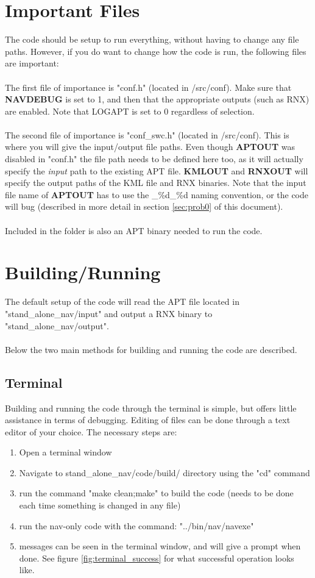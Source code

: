 \documentclass[10pt,a4paper]{article}
\begin{document}
\section{Important Files}
\label{sec:files}
The code should be setup to run everything, without having to change any file paths. However, if you do want to change how the code is run, the following files are important: \\ \\
\noindent
The first file of importance is "conf.h" (located in /src/conf). Make sure that \textbf{NAVDEBUG} is set to 1, and then that the appropriate outputs (such as RNX) are enabled. Note that LOGAPT is set to 0 regardless of selection. \\ \\
\noindent
The second file of importance is "conf\_swc.h" (located in /src/conf). This is where you will give the input/output file paths. Even though \textbf{APTOUT} was disabled in "conf.h" the file path needs to be defined here too, as it will actually specify the \textit{input} path to the existing APT file. \textbf{KMLOUT} and \textbf{RNXOUT} will specify the output paths of the KML file and RNX binaries. Note that the input file name of \textbf{APTOUT} has to use the \_\%d\_\%d naming convention, or the code will bug (described in more detail in section \ref{sec:prob0} of this document). \\ \\ 
\noindent
Included in the folder is also an APT binary needed to run the code.

\section{Building/Running}
The default setup of the code will read the APT file located in "stand\_alone\_nav/input" and output a RNX binary to "stand\_alone\_nav/output". \\ \\
\noindent
Below the two main methods for building and running the code are described.
\subsection{Terminal}
Building and running the code through the terminal is simple, but offers little assistance in terms of debugging. Editing of files can be done through a text editor of your choice. The necessary steps are:
\begin{enumerate}
\item Open a terminal window
\item Navigate to stand\_alone\_nav/code/build/ directory using the "cd" command
\item run the command "make clean;make" to build the code (needs to be done each time something is changed in any file)
\item run the nav-only code with the command: "../bin/nav/navexe"
\item messages can be seen in the terminal window, and will give a prompt when done. See figure \ref{fig:terminal_success} for what successful operation looks like.
\end{enumerate}
\end{document}
